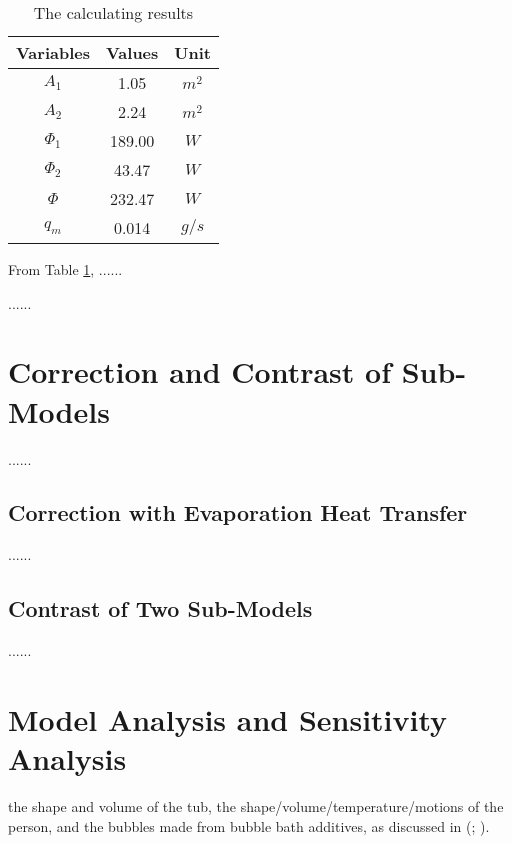 \documentclass{mcmthesis}
\begin{document}
\begin{table}[h]  %
\centering        %
\caption{The calculating results}  %
\vspace{0.15cm}     %
\label{tab2}        %
\begin{tabular}{|c|c|c|}  %
\hline                    %
Variables & Values & Unit     \\ \hline  %
$A_1$     & 1.05   &   $m^2$  \\ \hline
$A_2$     & 2.24   &   $m^2$  \\ \hline
$\Phi_1$  & 189.00 &   $W$   \\ \hline
$\Phi_2$  & 43.47  &   $W$   \\ \hline
$\Phi$    & 232.47 &   $W$   \\ \hline
$q_m$     & 0.014  &   $g/s$ \\ \hline
\end{tabular}
\end{table}
    
From Table \ref{tab2}, ......
    
......
    
\section{Correction and Contrast of Sub-Models}

......
    
\subsection{Correction with Evaporation Heat Transfer}
    
......
    
\subsection{Contrast of Two Sub-Models}
    
......
    
\section{Model Analysis and Sensitivity Analysis}
    
the shape and volume of 
the tub, the shape/volume/temperature/motions of the person, and the bubbles 
made from bubble bath additives, as discussed 
in (\cite{evaporation2018}; \cite{thesis2015}).
    
\end{document}
